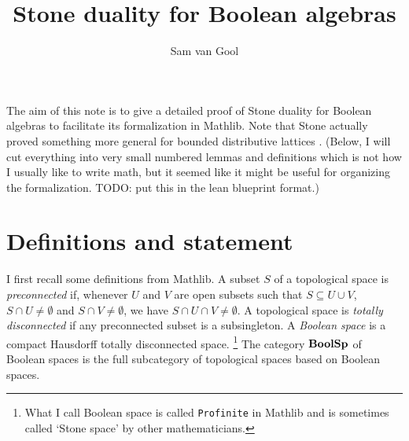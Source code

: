 \documentclass[a4paper,10pt]{article}
\title{Stone duality for Boolean algebras}
\author{Sam van Gool}
\numberwithin{theorem}{section}
\begin{document}
\maketitle

The aim of this note is to give a detailed proof of Stone duality for Boolean
algebras \cite{Sto1937BA} to facilitate its formalization in Mathlib. Note that
Stone actually proved something more general for bounded distributive lattices
\cite{Sto1937}. (Below, I will cut everything into very small numbered lemmas
and definitions which is not how I usually like to write math, but it seemed
like it might be useful for organizing the formalization. TODO: put this in the
lean blueprint format.)

\section{Definitions and statement}
I first recall some definitions from Mathlib. A subset $S$ of a topological
space is \emph{preconnected} if, whenever $U$ and $V$ are open subsets such
that $S \subseteq U \cup V$, $S \cap U \neq \emptyset$ and $S \cap V \neq
\emptyset$, we have $S \cap U \cap V \neq \emptyset$. A topological space is
\emph{totally disconnected} if any preconnected subset is a subsingleton. 
A \emph{Boolean space} is a compact Hausdorff totally disconnected space.%
\footnote{What I call Boolean space is called \texttt{Profinite} in Mathlib and
is sometimes called `Stone space' by other mathematicians.} The category
$\mathbf{BoolSp}$ of Boolean spaces is the full subcategory of topological spaces based
on Boolean spaces.
\end{document}
